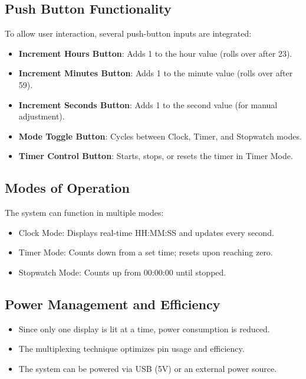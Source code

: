 \documentclass[journal]{IEEEtran}
\begin{document}
\subsection{Push Button Functionality}

To allow user interaction, several push-button inputs are integrated:

\begin{itemize}
    \item \textbf{Increment Hours Button}: Adds 1 to the hour value (rolls over after 23).
    \item \textbf{Increment Minutes Button}: Adds 1 to the minute value (rolls over after 59).
    \item \textbf{Increment Seconds Button}: Adds 1 to the second value (for manual adjustment).
    \item \textbf{Mode Toggle Button}: Cycles between Clock, Timer, and Stopwatch modes.
    \item \textbf{Timer Control Button}: Starts, stops, or resets the timer in Timer Mode.
\end{itemize}

\subsection{Modes of Operation}

The system can function in multiple modes:

\begin{itemize}
    \item Clock Mode: Displays real-time HH:MM:SS and updates every second.
    \item Timer Mode: Counts down from a set time; resets upon reaching zero.
    \item Stopwatch Mode: Counts up from 00:00:00 until stopped.
\end{itemize}

\subsection{Power Management and Efficiency}

\begin{itemize}
    \item Since only one display is lit at a time, power consumption is reduced.
    \item The multiplexing technique optimizes pin usage and efficiency.
    \item The system can be powered via USB (5V) or an external power source.
\end{itemize}
\end{document}
